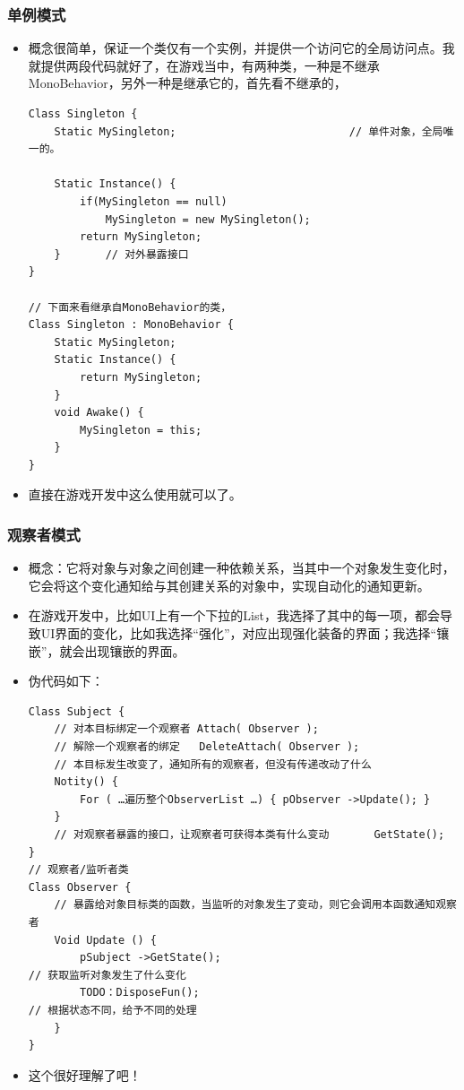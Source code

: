 \documentclass[9pt, b5paper]{article}
\begin{document}
\subsubsection{单例模式}
\label{sec:org4ff6f65}
\begin{itemize}
\item 概念很简单，保证一个类仅有一个实例，并提供一个访问它的全局访问点。我就提供两段代码就好了，在游戏当中，有两种类，一种是不继承MonoBehavior，另外一种是继承它的，首先看不继承的，
\begin{verbatim}
Class Singleton {
    Static MySingleton;                           // 单件对象，全局唯一的。

    Static Instance() {
        if(MySingleton == null)
            MySingleton = new MySingleton();
        return MySingleton;
    }       // 对外暴露接口
}

// 下面来看继承自MonoBehavior的类，
Class Singleton : MonoBehavior {
    Static MySingleton;                          
    Static Instance() {
        return MySingleton;
    }    
    void Awake() {
        MySingleton = this;
    }
}
\end{verbatim}
\item 直接在游戏开发中这么使用就可以了。
\end{itemize}
\subsubsection{观察者模式}
\label{sec:orga5e1c2e}
\begin{itemize}
\item 概念：它将对象与对象之间创建一种依赖关系，当其中一个对象发生变化时，它会将这个变化通知给与其创建关系的对象中，实现自动化的通知更新。
\item 在游戏开发中，比如UI上有一个下拉的List，我选择了其中的每一项，都会导致UI界面的变化，比如我选择“强化”，对应出现强化装备的界面；我选择“镶嵌”，就会出现镶嵌的界面。
\item 伪代码如下：
\begin{verbatim}
Class Subject {
    // 对本目标绑定一个观察者 Attach( Observer );
    // 解除一个观察者的绑定   DeleteAttach( Observer );
    // 本目标发生改变了，通知所有的观察者，但没有传递改动了什么
    Notity() {
        For ( …遍历整个ObserverList …) { pObserver ->Update(); }
    }
    // 对观察者暴露的接口，让观察者可获得本类有什么变动       GetState();
}
// 观察者/监听者类
Class Observer {
    // 暴露给对象目标类的函数，当监听的对象发生了变动，则它会调用本函数通知观察者
    Void Update () {
        pSubject ->GetState();  
// 获取监听对象发生了什么变化
        TODO：DisposeFun();  
// 根据状态不同，给予不同的处理
    }
}
\end{verbatim}
\item 这个很好理解了吧！
\end{itemize}
\end{document}
